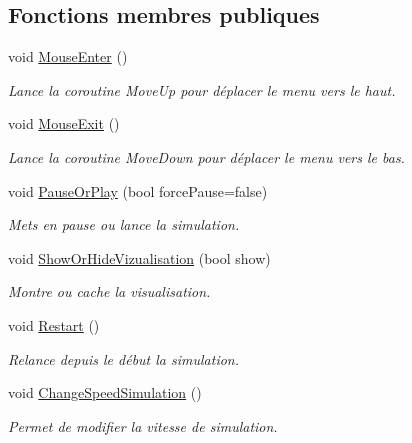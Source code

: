 \subsection*{Fonctions membres publiques}
\begin{DoxyCompactItemize}
\item 
void \mbox{\hyperlink{class_menu_visualization_u_i_ade48d2d4dd652f9f693072bf3d6a5c1c}{Mouse\+Enter}} ()
\begin{DoxyCompactList}\small\item\em Lance la coroutine Move\+Up pour déplacer le menu vers le haut. \end{DoxyCompactList}\item 
void \mbox{\hyperlink{class_menu_visualization_u_i_a47ce6ce3497846e9048582985fc3d8be}{Mouse\+Exit}} ()
\begin{DoxyCompactList}\small\item\em Lance la coroutine Move\+Down pour déplacer le menu vers le bas. \end{DoxyCompactList}\item 
void \mbox{\hyperlink{class_menu_visualization_u_i_a9affc75173b7b9e70340b2b934398464}{Pause\+Or\+Play}} (bool force\+Pause=false)
\begin{DoxyCompactList}\small\item\em Mets en pause ou lance la simulation. \end{DoxyCompactList}\item 
void \mbox{\hyperlink{class_menu_visualization_u_i_ab06398a58bc8438ead7172d9e09b8bca}{Show\+Or\+Hide\+Vizualisation}} (bool show)
\begin{DoxyCompactList}\small\item\em Montre ou cache la visualisation. \end{DoxyCompactList}\item 
void \mbox{\hyperlink{class_menu_visualization_u_i_ad71bfeae87aee9f53387e7abf59040c4}{Restart}} ()
\begin{DoxyCompactList}\small\item\em Relance depuis le début la simulation. \end{DoxyCompactList}\item 
void \mbox{\hyperlink{class_menu_visualization_u_i_abae4f4813543053bd5fc9d68ed4916d5}{Change\+Speed\+Simulation}} ()
\begin{DoxyCompactList}\small\item\em Permet de modifier la vitesse de simulation. \end{DoxyCompactList}\item 

\end{DoxyCompactItemize}
